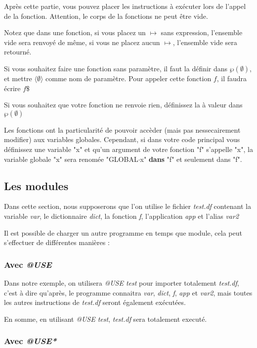 \documentclass{article}
\begin{document}
Après cette partie, vous pouvez placer les instructions à exécuter lors de l'appel de la fonction. Attention, le corps de la fonctions ne peut être vide. 

Notez que dans une fonction, si vous placez un $\longmapsto$ sans expression, l'ensemble vide sera renvoyé de même, si vous ne placez aucun $\longmapsto$, l'ensemble vide sera retourné.

Si vous souhaitez faire une fonction sans paramètre, il faut la définir dans $\wp(\emptyset)$, et mettre $\langle \emptyset \rangle$ comme nom de paramètre. Pour appeler cette fonction $f$, il faudra écrire $f\$$

Si vous souhaitez que votre fonction ne renvoie rien, définissez la à valeur dans $\wp(\emptyset)$

Les fonctions ont la particularité de pouvoir accèder (mais pas nessecairement modifier) aux variables globales. Cependant, si dans votre code principal vous définissez une variable "x" et qu'un argument de votre fonction "f" s'appelle "x", la variable globale "x" sera renomée "GLOBAL$\cdot$x" \textbf{dans} "f" et seulement dans "f".

\subsection{Les modules}
Dans cette section, nous supposerons que l'on utilise le fichier \textit{test.df} contenant la variable \textit{var}, le dictionnaire \textit{dict}, la fonction \textit{f}, l'application \textit{app} et l'alias \textit{var2}

Il est possible de charger un autre programme en temps que module, cela peut s'effectuer de différentes manières :

\subsubsection{Avec \textit{@USE}}
Dans notre exemple, on utilisera \textit{@USE test} pour importer totalement \textit{test.df}, c'est à dire qu'après, le programme connaitra \textit{var}, \textit{dict}, \textit{f}, \textit{app} et \textit{var2}, mais toutes les autres instructions de \textit{test.df} seront également exécutées. 

En somme, en utilisant \textit{@USE test}, \textit{test.df} sera totalement executé.

\subsubsection{Avec \textit{@USE*}}
\end{document}
